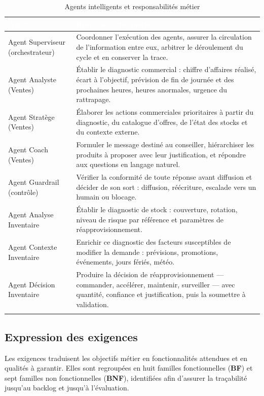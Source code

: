 \begin{longtable}{|P{4.2cm}|P{10.0cm}|}
\hline
{}
\textcolor{white}{\textbf{Agent}} &
\textcolor{white}{\textbf{Responsabilité métier}} \\
\hline
\endhead
\hline
\endfoot
\hline
\endlastfoot
Agent Superviseur \newline (orchestrateur) &
Coordonner l'exécution des agents, assurer la circulation de l'information entre eux, arbitrer le déroulement du cycle et en conserver la trace. \\
\hline
Agent Analyste (Ventes) &
Établir le diagnostic commercial : chiffre d'affaires réalisé, écart à l'objectif, prévision de fin de journée et des prochaines heures, heures anormales, urgence du rattrapage. \\
\hline
Agent Stratège (Ventes) &
Élaborer les actions commerciales prioritaires à partir du diagnostic, du catalogue d'offres, de l'état des stocks et du contexte externe. \\
\hline
Agent Coach (Ventes) &
Formuler le message destiné au conseiller, hiérarchiser les produits à proposer avec leur justification, et répondre aux questions en langage naturel. \\
\hline
Agent Guardrail (contrôle) &
Vérifier la conformité de toute réponse avant diffusion et décider de son sort : diffusion, réécriture, escalade vers un humain ou blocage. \\
\hline
Agent Analyse Inventaire &
Établir le diagnostic de stock : couverture, rotation, niveau de risque par référence et paramètres de réapprovisionnement. \\
\hline
Agent Contexte Inventaire &
Enrichir ce diagnostic des facteurs susceptibles de modifier la demande : prévisions, promotions, événements, jours fériés, météo. \\
\hline
Agent Décision Inventaire &
Produire la décision de réapprovisionnement — commander, accélérer, maintenir, surveiller — avec quantité, confiance et justification, puis la soumettre à validation. \\
\hline
\caption{Agents intelligents et responsabilités métier}
\label{tab:agents-intelligents-chap2}
\end{longtable}

\subsection{Expression des exigences}

Les exigences traduisent les objectifs métier en fonctionnalités attendues et en qualités à garantir. Elles sont regroupées en huit familles fonctionnelles (\textbf{BF}) et sept familles non fonctionnelles (\textbf{BNF}), identifiées afin d'assurer la traçabilité jusqu'au backlog et jusqu'à l'évaluation.


